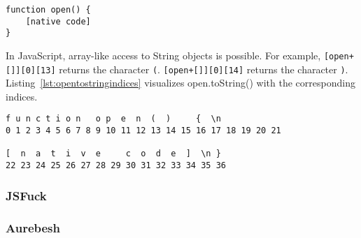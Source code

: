 \begin{lstlisting}[style=basicStyle, caption=open.toString() in JavaScript, label={lst:opentostring}]
function open() {
    [native code]
}
\end{lstlisting}

In JavaScript, array-like access to String objects is possible. \cite{js/stringbrackets} For example, \verb|[open+[]][0][13]| returns the character \verb|(|. \verb|[open+[]][0][14]| returns the character \verb|)|. Listing~\ref{lst:opentostringindices} visualizes open.toString() with the corresponding indices.

\begin{lstlisting}[style=basicStyle, caption=open.toString() with indices in JavaScript, label={lst:opentostringindices}]
f u n c t i o n   o p  e  n  (  )     {  \n
0 1 2 3 4 5 6 7 8 9 10 11 12 13 14 15 16 17 18 19 20 21

[  n  a  t  i  v  e     c  o  d  e  ]  \n }
22 23 24 25 26 27 28 29 30 31 32 33 34 35 36
\end{lstlisting}


\subsubsection{JSFuck}


\subsubsection{Aurebesh}



